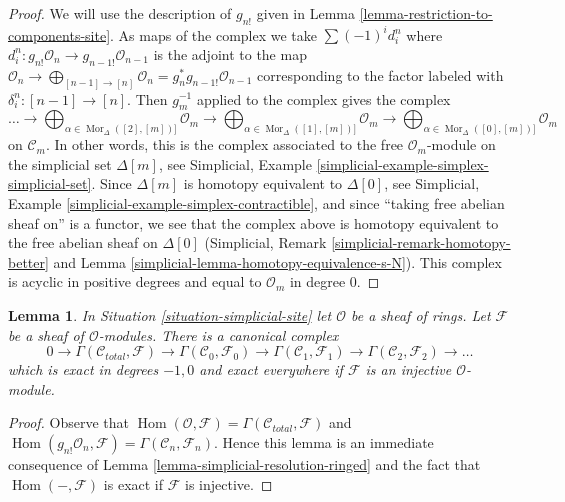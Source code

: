 \documentclass{stacks-project}
\theoremstyle{plain}
\newtheorem{lemma}[subsection]{Lemma}
\theoremstyle{definition}
\theoremstyle{remark}
\numberwithin{equation}{subsection}
\def\Hom{\mathop{\mathrm{Hom}}\nolimits}
\def\Mor{\mathop{\mathrm{Mor}}\nolimits}
\begin{document}
\begin{proof}
We will use the description of $g_{n!}$ given in
Lemma \ref{lemma-restriction-to-components-site}.
As maps of the complex we take $\sum (-1)^i d^n_i$ where
$d^n_i : g_{n!}\mathcal{O}_n \to g_{n - 1!}\mathcal{O}_{n - 1}$
is the adjoint to the map
$\mathcal{O}_n \to \bigoplus_{[n - 1] \to [n]} \mathcal{O}_n =
g_n^*g_{n - 1!}\mathcal{O}_{n - 1}$
corresponding to the factor labeled with $\delta^n_i : [n - 1] \to [n]$.
Then $g_m^{-1}$ applied to the complex gives the complex
$$
\ldots \to
\bigoplus\nolimits_{\alpha \in \Mor_\Delta([2], [m])]} \mathcal{O}_m \to
\bigoplus\nolimits_{\alpha \in \Mor_\Delta([1], [m])]} \mathcal{O}_m \to
\bigoplus\nolimits_{\alpha \in \Mor_\Delta([0], [m])]} \mathcal{O}_m
$$
on $\mathcal{C}_m$.
In other words, this is the complex associated to the
free $\mathcal{O}_m$-module on the simplicial set $\Delta[m]$, see
Simplicial, Example \ref{simplicial-example-simplex-simplicial-set}.
Since $\Delta[m]$ is homotopy equivalent to $\Delta[0]$, see
Simplicial, Example \ref{simplicial-example-simplex-contractible},
and since ``taking free abelian sheaf on'' is a functor,
we see that the complex above is homotopy equivalent to
the free abelian sheaf on $\Delta[0]$
(Simplicial, Remark \ref{simplicial-remark-homotopy-better} and
Lemma \ref{simplicial-lemma-homotopy-equivalence-s-N}).
This complex is acyclic in positive degrees
and equal to $\mathcal{O}_m$ in degree $0$.
\end{proof}

\begin{lemma}
\label{lemma-cech-complex-modules}
In Situation \ref{situation-simplicial-site} let $\mathcal{O}$
be a sheaf of rings. Let $\mathcal{F}$ be a
sheaf of $\mathcal{O}$-modules. There is a canonical complex
$$
0 \to \Gamma(\mathcal{C}_{total}, \mathcal{F}) \to
\Gamma(\mathcal{C}_0, \mathcal{F}_0) \to
\Gamma(\mathcal{C}_1, \mathcal{F}_1) \to
\Gamma(\mathcal{C}_2, \mathcal{F}_2) \to \ldots
$$
which is exact in degrees $-1, 0$ and exact everywhere
if $\mathcal{F}$ is an injective $\mathcal{O}$-module.
\end{lemma}

\begin{proof}
Observe that
$\Hom(\mathcal{O}, \mathcal{F}) = \Gamma(\mathcal{C}_{total}, \mathcal{F})$
and
$\Hom(g_{n!}\mathcal{O}_n, \mathcal{F}) = \Gamma(\mathcal{C}_n, \mathcal{F}_n)$.
Hence this lemma is an immediate consequence of
Lemma \ref{lemma-simplicial-resolution-ringed}
and the fact that $\Hom(-, \mathcal{F})$ is exact if
$\mathcal{F}$ is injective.
\end{proof}
\end{document}
